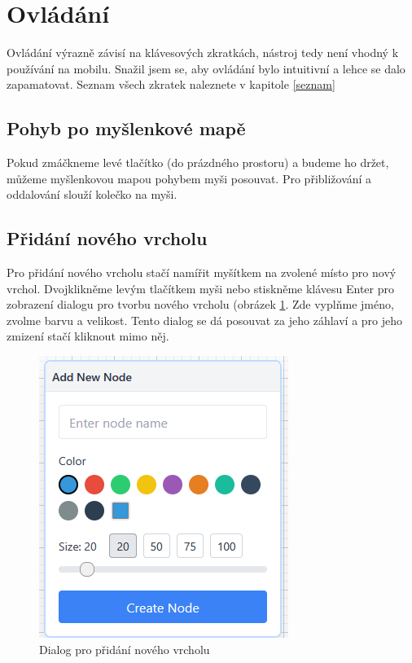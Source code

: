 \section{Ovládání}
Ovládání výrazně závisí na klávesových zkratkách, nástroj tedy není vhodný k používání na mobilu. Snažil jsem se, aby ovládání bylo intuitivní a lehce se dalo zapamatovat. Seznam všech zkratek naleznete v kapitole \ref{seznam}
\subsection{Pohyb po myšlenkové mapě}
Pokud zmáčkneme levé tlačítko (do prázdného prostoru) a budeme ho držet, můžeme myšlenkovou mapou pohybem myši posouvat. Pro přibližování a oddalování slouží kolečko na myši.
\subsection{Přidání nového vrcholu}
Pro přidání nového vrcholu stačí namířit myšítkem na zvolené místo pro nový vrchol. Dvojklikněme levým tlačítkem myši nebo stiskněme klávesu Enter pro zobrazení dialogu pro tvorbu nového vrcholu (obrázek \ref{fig:input}. Zde vyplňme jméno, zvolme barvu a velikost. Tento dialog se dá posouvat za jeho záhlaví a pro jeho zmizení stačí kliknout mimo něj.
\begin{figure}[h]
    \centering
    \includegraphics[width=0.5\linewidth]{Images/inputdialog.png}
    \caption{Dialog pro přidání nového vrcholu}
    \label{fig:input}
\end{figure}

